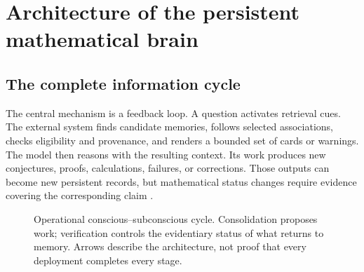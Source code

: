 \section{Architecture of the persistent mathematical brain}

\subsection{The complete information cycle}

The central mechanism is a feedback loop. A question activates retrieval cues. The external system finds candidate memories, follows selected associations, checks eligibility and provenance, and renders a bounded set of cards or warnings. The model then reasons with the resulting context. Its work produces new conjectures, proofs, calculations, failures, or corrections. Those outputs can become new persistent records, but mathematical status changes require evidence covering the corresponding claim \citep{matharchitecture,canonical}.

\begin{figure}[htbp]
\centering
{}
\caption{Operational conscious--subconscious cycle. Consolidation proposes work; verification controls the evidentiary status of what returns to memory. Arrows describe the architecture, not proof that every deployment completes every stage.}
\label{fig:cycle}
\end{figure}

